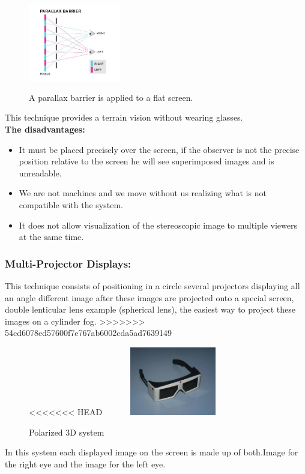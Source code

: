\begin{figure}[h!]
\begin{center}
\begin{minipage}{1\linewidth}
\centering\includegraphics[width=4cm,height=4cm]{image/parallax.jpg}
\caption{A parallax barrier is applied to a flat screen.}
\end{minipage}
\end{center}
\end{figure}

This technique provides a terrain vision without wearing glasses.\\
\textbf{The disadvantages:}
\begin{itemize}

\item It must be placed precisely over the screen, if the observer is not the precise position relative to the screen he will see superimposed images and is unreadable.
\item We are not machines and we move without us realizing what is not compatible with the system.
\item It does not allow visualization of the stereoscopic image to multiple viewers at the same time.
\end{itemize}
\subsubsection{Multi-Projector Displays:}

This technique consists of positioning in a circle several projectors displaying all an angle different image after these images are projected onto a special screen, double lenticular lens example (spherical lens), the easiest way to project these images on a cylinder fog.
>>>>>>> 54cd6078ed57600f7e767ab6002cda5ad7639149

\begin{figure}[h!]
\begin{center}
\begin{minipage}{1\linewidth}
<<<<<<< HEAD
\centering\includegraphics[width=6cm,height=30mm]{image/2.jpg}
\caption{Polarized 3D system\cite{Polarized3D}}
\end{minipage}
\end{center}
\end{figure}
In this system each displayed image on the screen is made up of both.Image for the right eye and the image for the left eye.
